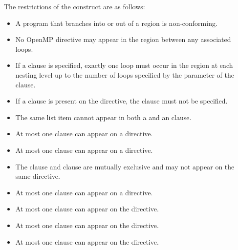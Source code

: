 \restrictions
The restrictions of the  construct are as follows:
\begin{itemize}
\item A program that branches into or out of a  region 
      is non-conforming.
\item No OpenMP directive may appear in the region between any associated loops.
\item If a  clause is specified, exactly one loop must
      occur in the region at each nesting level up to the number of loops
      specified by the parameter of the  clause.
\item If a  clause is present on the  
      directive, the  clause must not be specified.
\item The same list item cannot appear in both a  and 
      an  clause.
\item At most one  clause can appear on a  directive.
\item At most one  clause can appear on a  directive.
\item The  clause and  clause are mutually 
      exclusive and may not appear on the same  directive.
\item At most one  clause can appear on a  directive.
\item At most one  clause can appear on the directive.
\item At most one  clause can appear on the directive.
\item At most one  clause can appear on the directive.
\end{itemize}

